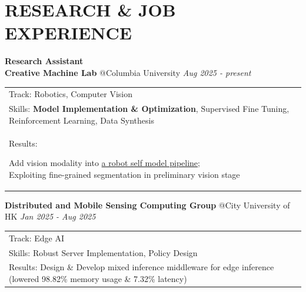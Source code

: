 \documentclass[a4paper,9pt]{extarticle}
\begin{document}
\section*{RESEARCH \& JOB EXPERIENCE}
    \textbf{\Large Research Assistant} \\
    \textbf{Creative Machine Lab} @Columbia University \hfill \textit{Aug 2025 - present}\\
    \vspace{2pt}
    \noindent
    \begin{tabular}{@{$\circ$\hspace{0.5em}} l}
        Track: Robotics, Computer Vision \\
        Skills: \textbf{Model Implementation \& Optimization}, Supervised Fine Tuning, Reinforcement Learning, Data Synthesis\\
        Results:
        \parbox[t]{0.8\textwidth}
        {Add vision modality into \href{https://arxiv.org/pdf/2412.05507}{a robot self model pipeline}; \\
        Exploiting fine-grained segmentation in preliminary vision stage}
    \end{tabular}
    
    \noindent
    \newline
    \textbf{Distributed and Mobile Sensing Computing Group} @City University of HK \hfill \textit{Jan 2025 - Aug 2025}\\
    \vspace{2pt}
    \noindent
    \begin{tabular}{@{$\circ$\hspace{0.5em}} l}
        Track: Edge AI \\
        Skills:  Robust Server Implementation, Policy Design\\
        Results: Design \& Develop mixed inference middleware for edge inference (lowered 98.82\% memory usage \& 7.32\% latency)
    \end{tabular}

\end{document}
